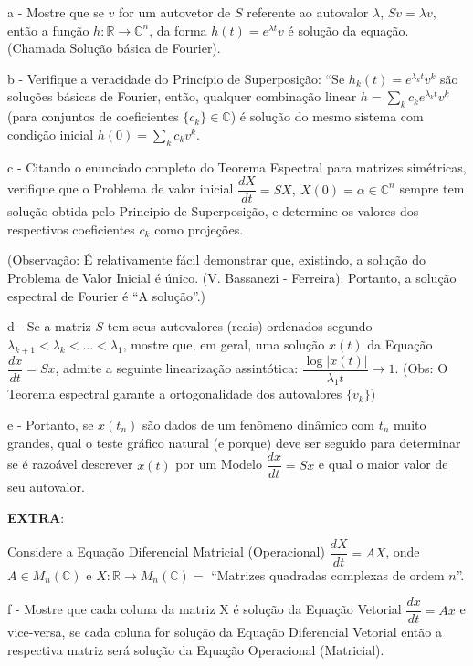 \begin{description}
\item a - Mostre que se $v$ for um autovetor de $S$ referente ao autovalor $\lambda$, $Sv = \lambda v$, então a função $h: \mathbb{R} \to \mathbb{C}^n$, da forma $h(t) = e^{\lambda t} v$ é solução da equação. (Chamada Solução básica de Fourier).
\item b - Verifique a veracidade do Princípio de Superposição: ``Se $h_k(t) = e^{\lambda_k t} v^k$ são soluções básicas de Fourier, então, qualquer combinação linear $h = \displaystyle\sum_k c_k e^{\lambda_k t} v^k$ (para conjuntos de coeficientes $\{c_k\} \in \mathbb{C}$) é solução do mesmo sistema com condição inicial \(h(0) = \displaystyle\sum_k c_k v^k\).
\item c - Citando o enunciado completo do Teorema Espectral para matrizes simétricas, verifique que o Problema de valor inicial \(\dfrac{dX}{dt} = SX,\ X(0) = \alpha \in \mathbb{C}^n\) sempre tem solução obtida pelo Principio de Superposição, e determine os valores dos respectivos coeficientes $c_k$ como projeções.

{\tiny (Observação: É relativamente fácil demonstrar que, existindo, a solução do Problema de Valor Inicial é único. (V. Bassanezi - Ferreira). Portanto, a solução espectral de Fourier é ``A solução''.)}

\item d - Se a matriz $S$ tem seus autovalores (reais) ordenados segundo $\lambda_{k+1} < \lambda_k < \ldots < \lambda_1$, mostre que, em geral, uma solução $x(t)$ da Equação $\dfrac{dx}{dt} = Sx$, admite a seguinte linearização assintótica: $\dfrac{\log|x(t)|}{\lambda_1 t} \to 1$. {\tiny (Obs: O Teorema espectral garante a ortogonalidade dos autovalores \(\{v_k\}\))}

\item e - Portanto, se $x(t_n)$ são dados de um fenômeno dinâmico com $t_n$ muito grandes, qual o teste gráfico natural (e porque) deve ser seguido para determinar se é razoável descrever $x(t)$ por um Modelo $\dfrac{dx}{dt} = Sx$ e qual o maior valor de seu autovalor.

\textbf{EXTRA}:

Considere a Equação Diferencial Matricial (Operacional) $\dfrac{dX}{dt} = AX$, onde $A \in M_n(\mathbb{C})$ e $X: \mathbb{R} \to M_n(\mathbb{C}) =$ ``Matrizes quadradas complexas de ordem $n$''.

\item f - Mostre que cada coluna da matriz X é solução da Equação Vetorial $\dfrac{dx}{dt} = Ax$ e vice-versa, se cada coluna for solução da Equação Diferencial Vetorial então a respectiva matriz será solução da Equação Operacional (Matricial).


\end{description}
